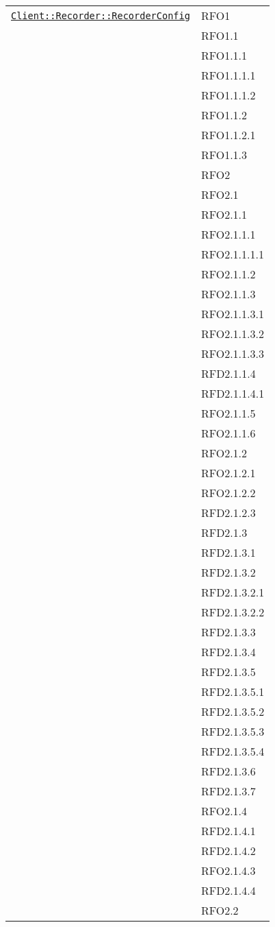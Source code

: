 \begin{longtable}{|>{\centering}m{10cm}|m{3cm}<{\centering}|}
\hyperref[Client::Recorder::RecorderConfig]{\texttt{Client::Recorder::RecorderConfig}} & RFO1\\
& RFO1.1\\
& RFO1.1.1\\
& RFO1.1.1.1\\
& RFO1.1.1.2\\
& RFO1.1.2\\
& RFO1.1.2.1\\
& RFO1.1.3\\
& RFO2\\
& RFO2.1\\
& RFO2.1.1\\
& RFO2.1.1.1\\
& RFO2.1.1.1.1\\
& RFO2.1.1.2\\
& RFO2.1.1.3\\
& RFO2.1.1.3.1\\
& RFO2.1.1.3.2\\
& RFO2.1.1.3.3\\
& RFD2.1.1.4\\
& RFD2.1.1.4.1\\
& RFO2.1.1.5\\
& RFO2.1.1.6\\
& RFO2.1.2\\
& RFO2.1.2.1\\
& RFO2.1.2.2\\
& RFD2.1.2.3\\
& RFD2.1.3\\
& RFD2.1.3.1\\
& RFD2.1.3.2\\
& RFD2.1.3.2.1\\
& RFD2.1.3.2.2\\
& RFD2.1.3.3\\
& RFD2.1.3.4\\
& RFD2.1.3.5\\
& RFD2.1.3.5.1\\
& RFD2.1.3.5.2\\
& RFD2.1.3.5.3\\
& RFD2.1.3.5.4\\
& RFD2.1.3.6\\
& RFD2.1.3.7\\
& RFO2.1.4\\
& RFD2.1.4.1\\
& RFD2.1.4.2\\
& RFO2.1.4.3\\
& RFD2.1.4.4\\
& RFO2.2\\

\end{longtable}
